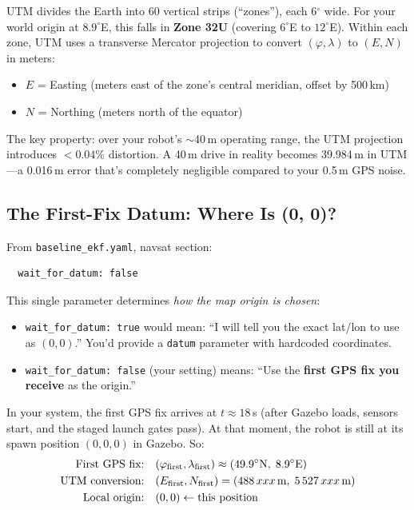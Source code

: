 \documentclass[11pt,a4paper]{article}
\begin{document}
UTM divides the Earth into 60 vertical strips (``zones''), each 6$^\circ$ wide.
For your world origin at $8.9^\circ$E, this falls in \textbf{Zone 32U}
(covering $6^\circ$E to $12^\circ$E). Within each zone, UTM uses a transverse
Mercator projection to convert $(\varphi, \lambda)$ to $(E, N)$ in meters:
\begin{itemize}
  \item $E$ = Easting (meters east of the zone's central meridian, offset by 500\,km)
  \item $N$ = Northing (meters north of the equator)
\end{itemize}

The key property: over your robot's $\sim$40\,m operating range, the UTM
projection introduces $< 0.04\%$ distortion. A 40\,m drive in reality
becomes 39.984\,m in UTM---a 0.016\,m error that's completely negligible
compared to your 0.5\,m GPS noise.

\subsection{The First-Fix Datum: Where Is (0, 0)?}

\begin{config}
From \texttt{baseline\_ekf.yaml}, navsat section:
\begin{verbatim}
  wait_for_datum: false
\end{verbatim}
\end{config}

\noindent This single parameter determines \emph{how the map origin is chosen}:

\begin{itemize}
  \item \texttt{wait\_for\_datum: true} would mean: ``I will tell you the exact
    lat/lon to use as $(0, 0)$.'' You'd provide a \texttt{datum} parameter
    with hardcoded coordinates.
  \item \texttt{wait\_for\_datum: false} (your setting) means: ``Use the
    \textbf{first GPS fix you receive} as the origin.''
\end{itemize}

In your system, the first GPS fix arrives at $t \approx 18$\,s (after Gazebo
loads, sensors start, and the staged launch gates pass). At that moment, the
robot is still at its spawn position $(0, 0, 0)$ in Gazebo. So:
\begin{align}
  \text{First GPS fix:} \quad &(\varphi_{\text{first}}, \lambda_{\text{first}}) \approx (49.9^\circ\text{N},\; 8.9^\circ\text{E}) \\
  \text{UTM conversion:} \quad &(E_{\text{first}}, N_{\text{first}}) = (488\,xxx\text{\,m},\; 5\,527\,xxx\text{\,m}) \\
  \text{Local origin:} \quad &(0, 0) \leftarrow \text{this position}
\end{align}
\end{document}
